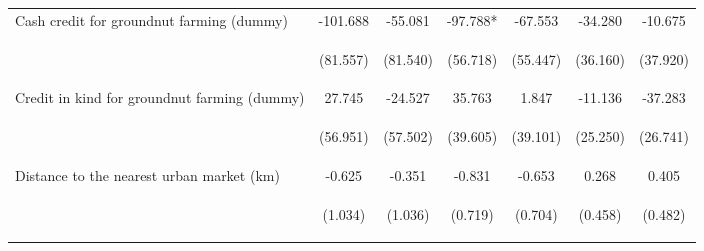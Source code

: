 \begin{center}
\begin{tabular}{lcccccc}
Cash credit for groundnut farming (dummy) & -101.688 & -55.081 & -97.788* & -67.553 & -34.280 & -10.675 \\
\vspace{4pt} & \begin{footnotesize}(81.557)\end{footnotesize} & \begin{footnotesize}(81.540)\end{footnotesize} & \begin{footnotesize}(56.718)\end{footnotesize} & \begin{footnotesize}(55.447)\end{footnotesize} & \begin{footnotesize}(36.160)\end{footnotesize} & \begin{footnotesize}(37.920)\end{footnotesize} \\
Credit in kind for groundnut farming (dummy) & 27.745 & -24.527 & 35.763 & 1.847 & -11.136 & -37.283 \\
\vspace{4pt} & \begin{footnotesize}(56.951)\end{footnotesize} & \begin{footnotesize}(57.502)\end{footnotesize} & \begin{footnotesize}(39.605)\end{footnotesize} & \begin{footnotesize}(39.101)\end{footnotesize} & \begin{footnotesize}(25.250)\end{footnotesize} & \begin{footnotesize}(26.741)\end{footnotesize} \\
Distance to the nearest urban market (km) & -0.625 & -0.351 & -0.831 & -0.653 & 0.268 & 0.405 \\
\vspace{4pt} & \begin{footnotesize}(1.034)\end{footnotesize} & \begin{footnotesize}(1.036)\end{footnotesize} & \begin{footnotesize}(0.719)\end{footnotesize} & \begin{footnotesize}(0.704)\end{footnotesize} & \begin{footnotesize}(0.458)\end{footnotesize} & \begin{footnotesize}(0.482)\end{footnotesize} \\

\end{tabular}
\end{center}
